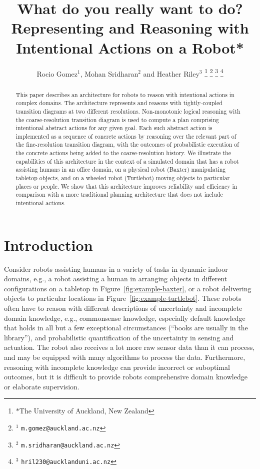 \documentclass[letterpaper, 10 pt, conference]{ieeeconf}  %
\title{\LARGE \bf What do you really want to do? Representing and
  Reasoning with Intentional Actions on a Robot*}
\author{Rocio Gomez$^{1}$, Mohan Sridharan$^{2}$ and Heather
  Riley$^{3}$%
  \thanks{$*$The University of Auckland, New
    Zealand}%
  \thanks{$^{1}$ {\tt\small m.gomez@auckland.ac.nz}}%
  \thanks{$^{2}$ {\tt\small m.sridharan@auckland.ac.nz}}%
  \thanks{$^{3}$ {\tt\small hril230@aucklanduni.ac.nz}}%
}
\begin{document}
\maketitle
\thispagestyle{empty}
\pagestyle{empty}


\begin{abstract}
  This paper describes an architecture for robots to reason with
  intentional actions in complex domains. The architecture represents
  and reasons with tightly-coupled transition diagrams at two
  different resolutions. Non-monotonic logical reasoning with the
  coarse-resolution transition diagram is used to compute a plan
  comprising intentional abstract actions for any given goal. Each
  such abstract action is implemented as a sequence of concrete
  actions by reasoning over the relevant part of the fine-resolution
  transition diagram, with the outcomes of probabilistic execution of
  the concrete actions being added to the coarse-resolution history.
  We illustrate the capabilities of this architecture in the context
  of a simulated domain that has a robot assisting humans in an office
  domain, on a physical robot (Baxter) manipulating tabletop objects,
  and on a wheeled robot (Turtlebot) moving objects to particular
  places or people. We show that this architecture improves
  reliability and efficiency in comparison with a more traditional
  planning architecture that does not include intentional actions.
\end{abstract}


\section{Introduction}
Consider robots assisting humans in a variety of tasks in dynamic
indoor domains, e.g., a robot assisting a human in arranging objects
in different configurations on a tabletop in
Figure~\ref{fig:example-baxter}, or a robot delivering objects to
particular locations in Figure~\ref{fig:example-turtlebot}. These
robots often have to reason with different descriptions of uncertainty
and incomplete domain knowledge, e.g., commonsense knowledge,
especially default knowledge that holds in all but a few exceptional
circumstances (``books are usually in the library''), and
probabilistic quantification of the uncertainty in sensing and
actuation. The robot also receives a lot more raw sensor data than it
can process, and may be equipped with many algorithms to process the
data. Furthermore, reasoning with incomplete knowledge can provide
incorrect or suboptimal outcomes, but it is difficult to provide
robots comprehensive domain knowledge or elaborate supervision.
\end{document}
